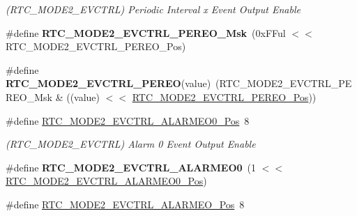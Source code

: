 \begin{DoxyCompactItemize}
\begin{DoxyCompactList}\small\item\em (R\+T\+C\+\_\+\+M\+O\+D\+E2\+\_\+\+E\+V\+C\+T\+R\+L) Periodic Interval x Event Output Enable \end{DoxyCompactList}\item 
\hypertarget{group___s_a_m_l21___r_t_c_ga576ec32168ce977d2184b06a3c13f9ab}{}\#define {\bfseries R\+T\+C\+\_\+\+M\+O\+D\+E2\+\_\+\+E\+V\+C\+T\+R\+L\+\_\+\+P\+E\+R\+E\+O\+\_\+\+Msk}~(0x\+F\+Ful $<$$<$ R\+T\+C\+\_\+\+M\+O\+D\+E2\+\_\+\+E\+V\+C\+T\+R\+L\+\_\+\+P\+E\+R\+E\+O\+\_\+\+Pos)\label{group___s_a_m_l21___r_t_c_ga576ec32168ce977d2184b06a3c13f9ab}

\item 
\hypertarget{group___s_a_m_l21___r_t_c_ga0883f9395151820c477a9a085091f544}{}\#define {\bfseries R\+T\+C\+\_\+\+M\+O\+D\+E2\+\_\+\+E\+V\+C\+T\+R\+L\+\_\+\+P\+E\+R\+E\+O}(value)~(R\+T\+C\+\_\+\+M\+O\+D\+E2\+\_\+\+E\+V\+C\+T\+R\+L\+\_\+\+P\+E\+R\+E\+O\+\_\+\+Msk \& ((value) $<$$<$ \hyperlink{group___s_a_m_l21___r_t_c_gaa39844189777bb350eb746728363f19f}{R\+T\+C\+\_\+\+M\+O\+D\+E2\+\_\+\+E\+V\+C\+T\+R\+L\+\_\+\+P\+E\+R\+E\+O\+\_\+\+Pos}))\label{group___s_a_m_l21___r_t_c_ga0883f9395151820c477a9a085091f544}

\item 
\hypertarget{group___s_a_m_l21___r_t_c_ga645fe312dccbd20f42dc01a8592b181e}{}\#define \hyperlink{group___s_a_m_l21___r_t_c_ga645fe312dccbd20f42dc01a8592b181e}{R\+T\+C\+\_\+\+M\+O\+D\+E2\+\_\+\+E\+V\+C\+T\+R\+L\+\_\+\+A\+L\+A\+R\+M\+E\+O0\+\_\+\+Pos}~8\label{group___s_a_m_l21___r_t_c_ga645fe312dccbd20f42dc01a8592b181e}

\begin{DoxyCompactList}\small\item\em (R\+T\+C\+\_\+\+M\+O\+D\+E2\+\_\+\+E\+V\+C\+T\+R\+L) Alarm 0 Event Output Enable \end{DoxyCompactList}\item 
\hypertarget{group___s_a_m_l21___r_t_c_ga9bf18dec027f214ac901472266166530}{}\#define {\bfseries R\+T\+C\+\_\+\+M\+O\+D\+E2\+\_\+\+E\+V\+C\+T\+R\+L\+\_\+\+A\+L\+A\+R\+M\+E\+O0}~(1 $<$$<$ \hyperlink{group___s_a_m_l21___r_t_c_ga645fe312dccbd20f42dc01a8592b181e}{R\+T\+C\+\_\+\+M\+O\+D\+E2\+\_\+\+E\+V\+C\+T\+R\+L\+\_\+\+A\+L\+A\+R\+M\+E\+O0\+\_\+\+Pos})\label{group___s_a_m_l21___r_t_c_ga9bf18dec027f214ac901472266166530}

\item 
\hypertarget{group___s_a_m_l21___r_t_c_gae505cc719343ed5fc7d59e19b1eafab8}{}\#define \hyperlink{group___s_a_m_l21___r_t_c_gae505cc719343ed5fc7d59e19b1eafab8}{R\+T\+C\+\_\+\+M\+O\+D\+E2\+\_\+\+E\+V\+C\+T\+R\+L\+\_\+\+A\+L\+A\+R\+M\+E\+O\+\_\+\+Pos}~8\label{group___s_a_m_l21___r_t_c_gae505cc719343ed5fc7d59e19b1eafab8}


\end{DoxyCompactItemize}
